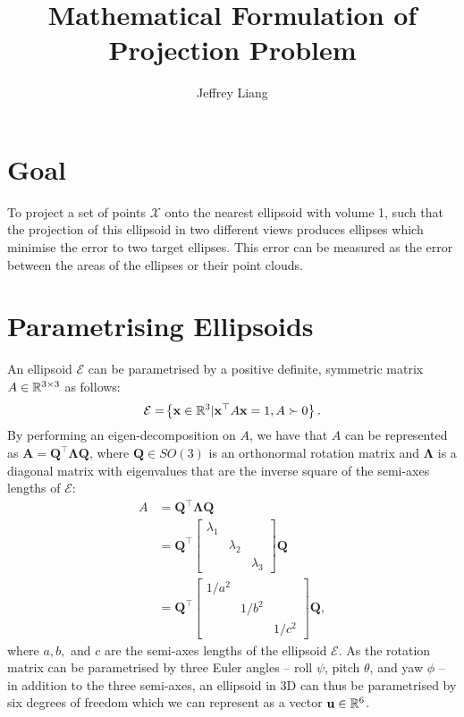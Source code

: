 \documentclass{article}
\title{Mathematical Formulation of Projection Problem}
\author{Jeffrey Liang}
\newcommand{\x}{\mathbf{x}}
\begin{document}
\maketitle

\section{Goal}
To project a set of points $\mathcal X$ onto the nearest ellipsoid with volume 1, such that the projection of this ellipsoid in two different views produces ellipses which minimise the error to two target ellipses. This error can be measured as the error between the areas of the ellipses or their point clouds.

\section{Parametrising Ellipsoids}

An ellipsoid $\mathcal E$ can be parametrised by a positive definite, symmetric matrix $A \in \mathbb{R}^{3\times 3}$ as follows:
\begin{equation}
    \mathcal E = \lrbrace{\x \in \R^3 | \x^\top A \x = 1, A \succ 0}.
\end{equation}
By performing an eigen-decomposition on $A$, we have that $A$ can be represented as $\mathbf A= \mathbf Q^\top \mathbf  \Lambda \mathbf  Q$, where $\mathbf Q\in SO(3)$ is an orthonormal rotation matrix and $\mathbf \Lambda$ is a diagonal matrix with eigenvalues that are the inverse square of the semi-axes lengths of $\mathcal E$:
\begin{align}
    A &= \mathbf Q^\top \mathbf \Lambda \mathbf Q \\
        & = \mathbf Q^\top \begin{bmatrix}
            \lambda_1 & & \\
            & \lambda_2 & \\
            & & \lambda_3
        \end{bmatrix}\mathbf Q \\
        &= \mathbf Q^\top \begin{bmatrix}
            1/a^2 & & \\
            & 1/b^2 & \\
            & & 1/c^2
        \end{bmatrix}\mathbf Q,
\end{align}
where $a, b,$ and $c$ are the semi-axes lengths of the ellipsoid $\mathcal E$. As the rotation matrix can be parametrised by three Euler angles -- roll $\psi$, pitch $\theta$, and yaw $\phi$ -- in addition to the three semi-axes, an ellipsoid in 3D can thus be parametrised by six degrees of freedom which we can represent as a vector $\mathbf u \in \mathbb{R}^6$. 
\end{document}
